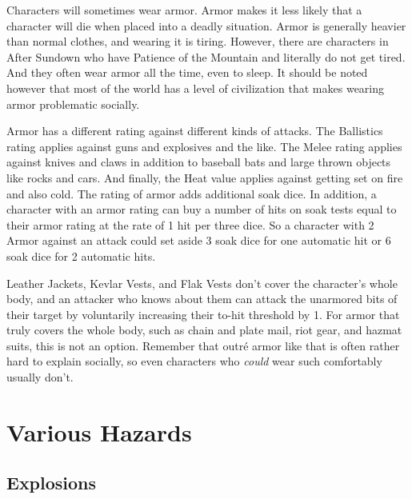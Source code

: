 Characters will sometimes wear armor. Armor makes it less likely that a character will die when placed into a deadly situation. Armor is generally heavier than normal clothes, and wearing it is tiring. However, there are characters in After Sundown who have Patience of the Mountain and literally do not get tired. And they often wear armor all the time, even to sleep. It should be noted however that most of the world has a level of civilization that makes wearing armor problematic socially.

Armor has a different rating against different kinds of attacks. The Ballistics rating applies against guns and explosives and the like. The Melee rating applies against knives and claws in addition to baseball bats and large thrown objects like rocks and cars. And finally, the Heat value applies against getting set on fire and also cold. The rating of armor adds additional soak dice. In addition, a character with an armor rating can buy a number of hits on soak tests equal to their armor rating at the rate of 1 hit per three dice. So a character with 2 Armor against an attack could set aside 3 soak dice for one automatic hit or 6 soak dice for 2 automatic hits.

Leather Jackets, Kevlar Vests, and Flak Vests don't cover the character's whole body, and an attacker who knows about them can attack the unarmored bits of their target by voluntarily increasing their to-hit threshold by 1. For armor that truly covers the whole body, such as chain and plate mail, riot gear, and hazmat suits, this is not an option. Remember that outr\'{e} armor like that is often rather hard to explain socially, so even characters who \textit{could} wear such comfortably usually don't.

\section{Various Hazards}

\subsection{Explosions}

